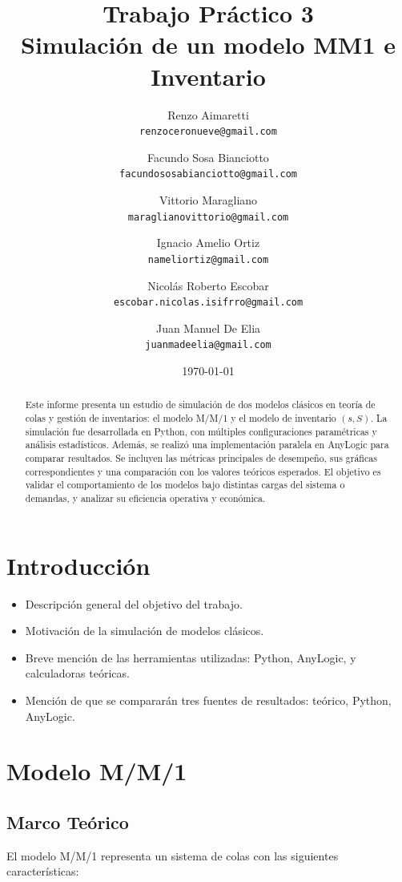 \documentclass[12pt]{article}
\title{Trabajo Práctico 3 \\
Simulación de un modelo MM1 e Inventario}
\author{
    Renzo Aimaretti \\ \texttt{renzoceronueve@gmail.com}
    \and
    Facundo Sosa Bianciotto \\ \texttt{facundososabianciotto@gmail.com}
    \and
    Vittorio Maragliano \\ \texttt{maraglianovittorio@gmail.com}
    \and
    Ignacio Amelio Ortiz \\ \texttt{nameliortiz@gmail.com}
    \and
    Nicolás Roberto Escobar \\ \texttt{escobar.nicolas.isifrro@gmail.com}
    \and
    Juan Manuel De Elia \\ \texttt{juanmadeelia@gmail.com}
}
\date{\today}
\begin{document}
\maketitle
\tableofcontents
\newpage

\begin{abstract}
Este informe presenta un estudio de simulación de dos modelos clásicos en teoría de colas y gestión de inventarios: el modelo M/M/1 y el modelo de inventario $(s, S)$. La simulación fue desarrollada en Python, con múltiples configuraciones paramétricas y análisis estadísticos. Además, se realizó una implementación paralela en AnyLogic para comparar resultados. Se incluyen las métricas principales de desempeño, sus gráficas correspondientes y una comparación con los valores teóricos esperados. El objetivo es validar el comportamiento de los modelos bajo distintas cargas del sistema o demandas, y analizar su eficiencia operativa y económica.
\end{abstract}

\section{Introducción}
\begin{itemize}
    \item Descripción general del objetivo del trabajo.
    \item Motivación de la simulación de modelos clásicos.
    \item Breve mención de las herramientas utilizadas: Python, AnyLogic, y calculadoras teóricas.
    \item Mención de que se compararán tres fuentes de resultados: teórico, Python, AnyLogic.
\end{itemize}

\section{Modelo M/M/1}

\subsection{Marco Teórico}

El modelo M/M/1 representa un sistema de colas con las siguientes características:
\end{document}
